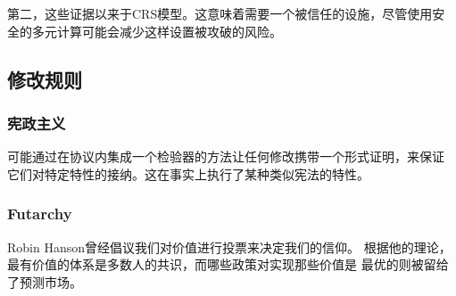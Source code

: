 \documentclass[letterpaper]{article}
\begin{document}
第二，这些证据以来于CRS模型。这意味着需要一个被信任的设施，尽管使用安
全的多元计算可能会减少这样设置被攻破的风险。

\subsection{修改规则}

\subsubsection{宪政主义}

可能通过在协议内集成一个检验器的方法让任何修改携带一个形式证明，来保证
它们对特定特性的接纳。这在事实上执行了某种类似宪法的特性。


\subsubsection{Futarchy}
Robin Hanson曾经倡议我们对价值进行投票来决定我们的信仰\cite{Futarchy}。
根据他的理论，最有价值的体系是多数人的共识，而哪些政策对实现那些价值是
最优的则被留给了预测市场。
\end{document}
